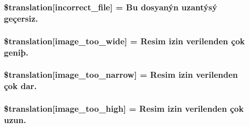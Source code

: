 \subsubsection[{\$translation}]{\setlength{\rightskip}{0pt plus 5cm}\$translation\mbox{[}\textquotesingle{}incorrect\+\_\+file\textquotesingle{}\mbox{]} = \textquotesingle{}Bu dosyanýn uzantýsý geçersiz.\textquotesingle{}}\label{class_8upload_8tr___t_r_8php_a4d32343e2699edd6fd435f9c832cb9c7}
\hypertarget{class_8upload_8tr___t_r_8php_a0dd3e4930ca1f59ae280f4b1006525cd}{}
\subsubsection[{\$translation}]{\setlength{\rightskip}{0pt plus 5cm}\$translation\mbox{[}\textquotesingle{}image\+\_\+too\+\_\+wide\textquotesingle{}\mbox{]} = \textquotesingle{}Resim izin verilenden çok geniþ.\textquotesingle{}}\label{class_8upload_8tr___t_r_8php_a0dd3e4930ca1f59ae280f4b1006525cd}
\hypertarget{class_8upload_8tr___t_r_8php_a5c9a4cd67fd21c32e0a3b434591a6037}{}
\subsubsection[{\$translation}]{\setlength{\rightskip}{0pt plus 5cm}\$translation\mbox{[}\textquotesingle{}image\+\_\+too\+\_\+narrow\textquotesingle{}\mbox{]} = \textquotesingle{}Resim izin verilenden çok dar.\textquotesingle{}}\label{class_8upload_8tr___t_r_8php_a5c9a4cd67fd21c32e0a3b434591a6037}
\hypertarget{class_8upload_8tr___t_r_8php_aa27bde361343f3b63c7cd441860024f8}{}
\subsubsection[{\$translation}]{\setlength{\rightskip}{0pt plus 5cm}\$translation\mbox{[}\textquotesingle{}image\+\_\+too\+\_\+high\textquotesingle{}\mbox{]} = \textquotesingle{}Resim izin verilenden çok uzun.\textquotesingle{}}\label{class_8upload_8tr___t_r_8php_aa27bde361343f3b63c7cd441860024f8}
\hypertarget{class_8upload_8tr___t_r_8php_a86fcd4e1157b00032df451188d735527}{}
